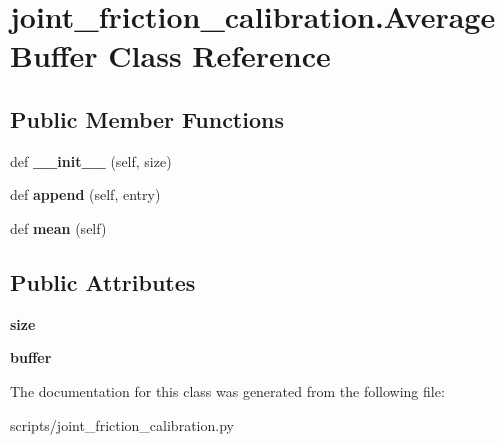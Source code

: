\hypertarget{classjoint__friction__calibration_1_1AverageBuffer}{}\section{joint\+\_\+friction\+\_\+calibration.\+Average\+Buffer Class Reference}
\label{classjoint__friction__calibration_1_1AverageBuffer}
\subsection*{Public Member Functions}
\begin{DoxyCompactItemize}
\item 
\mbox{\label{classjoint__friction__calibration_1_1AverageBuffer_a742b8af098ce736a136f8a521d487477}} 
def {\bfseries \+\_\+\+\_\+init\+\_\+\+\_\+} (self, size)
\item 
\mbox{\label{classjoint__friction__calibration_1_1AverageBuffer_aa24f672f6918fbe9ce02f42df9f16146}} 
def {\bfseries append} (self, entry)
\item 
\mbox{\label{classjoint__friction__calibration_1_1AverageBuffer_a51efff48ff2fbeb14a4922359fccbd7b}} 
def {\bfseries mean} (self)
\end{DoxyCompactItemize}
\subsection*{Public Attributes}
\begin{DoxyCompactItemize}
\item 
\mbox{\label{classjoint__friction__calibration_1_1AverageBuffer_a6e841fa4d6781b8bbb7073a3fc42e055}} 
{\bfseries size}
\item 
\mbox{\label{classjoint__friction__calibration_1_1AverageBuffer_aaee4542bc836eca35ab3cfc5e1af09c7}} 
{\bfseries buffer}
\end{DoxyCompactItemize}


The documentation for this class was generated from the following file\+:\begin{DoxyCompactItemize}
\item 
scripts/joint\+\_\+friction\+\_\+calibration.\+py\end{DoxyCompactItemize}
